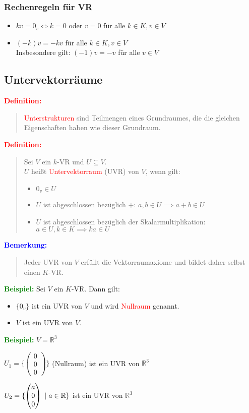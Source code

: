 \documentclass{article}
\newcommand{\smsp}{\phantom{\hspace{3px}}}
\newcommand{\red}[1]{\textcolor{red}{#1}}
\newcommand{\blue}[1]{\textcolor{blue}{#1}}
\newcommand{\green}[1]{\textcolor{green}{#1}}
\newcommand{\ex}{\green{\textbf{Beispiel: }}}
\newcommand{\de}[1]{\red{\textbf{Definition: }}\begin{quote}#1\end{quote}}
\newcommand{\an}[1]{\blue{\textbf{Bemerkung: }}\begin{quote}#1\end{quote}}
\newcommand{\R}{\mathbb{R}}
\renewcommand{\st}{\smsp | \smsp}
\newcommand{\vvvec}[3]{\begin{pmatrix}#1\\#2\\#3\end{pmatrix}}
\begin{document}
\subsubsection{Rechenregeln für VR}

\begin{itemize}
    \item $kv = 0_v \iff k = 0$ oder $v = 0$ für alle $k \in K, v \in V$
    \item $(-k)v = -kv$ für alle $k \in K, v \in V$\\
    Insbesondere gilt: $(-1)v = -v$ für alle $v \in V$
\end{itemize}

\subsection{Untervektorräume}

\de{
    \red{Unterstrukturen} sind Teilmengen eines Grundraumes, die die gleichen Eigenschaften haben wie dieser Grundraum.
}
\de{
    Sei $V$ ein $k$-VR und $U \subseteq V$.\\
    $U$ heißt \red{Untervektorraum} (UVR) von $V$, wenn gilt:
    \begin{itemize}
        \item $0_v \in U$
        \item $U$ ist abgeschlossen bezüglich $+$: $a, b \in U \implies a + b \in U$
        \item $U$ ist abgeschlossen bezüglich der Skalarmultiplikation:\\
        $a \in U, k \in K \implies ka \in U$
    \end{itemize}
}
\an{
    Jeder UVR von $V$ erfüllt die Vektorraumaxiome und bildet daher selbst einen $K$-VR.
}

\ex Sei $V$ ein $K$-VR. Dann gilt:
\begin{itemize}
    \item $\{0_v\}$ ist ein UVR von $V$ und wird \red{Nullraum} genannt.
    \item $V$ ist ein UVR von $V$.
\end{itemize}

\ex $V = \R^3$

$U_1 = \{\vvvec{0}{0}{0}\}$ (Nullraum) ist ein UVR von $\R^3$

$U_2 = \{\vvvec{a}{0}{0} \st a \in \R\}$ ist ein UVR von $\R^3$
\end{document}
